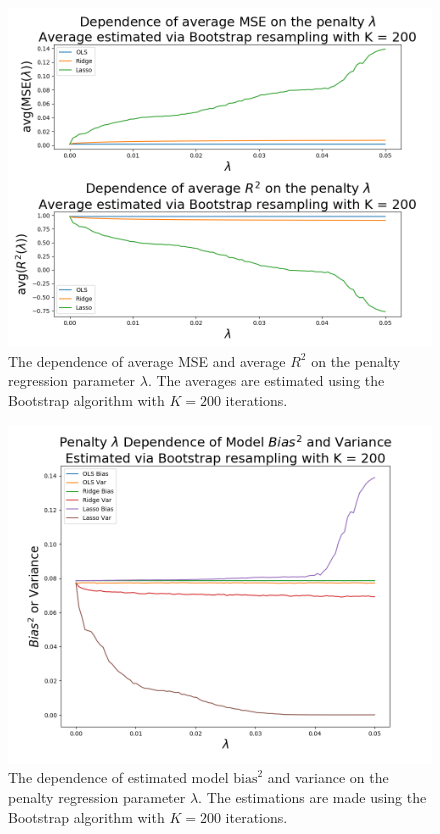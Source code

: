 \documentclass[reprint,english]{revtex4-1}
\begin{document}
\begin{figure}[h]
\centering
\includegraphics[scale=0.3,clip,trim={0cm 0cm 0cm 0cm}]{results/FrankeApprox/error2_deg5.png}
\caption{The dependence of average MSE and average \(R^2\) on the penalty regression parameter \(\lambda\). The averages are estimated using the Bootstrap algorithm with \(K=200\) iterations.}\label{fig:error_penalty_dependence_resampled}
\end{figure}

\begin{figure}[h]
\centering
\includegraphics[scale=0.3,clip,trim={0cm 0cm 0cm 0cm}]{results/FrankeApprox/error3_deg5.png}
\caption{The dependence of estimated model \(\text{bias}^2\) and variance on the penalty regression parameter \(\lambda\). The estimations are made using the Bootstrap algorithm with \(K=200\) iterations.}\label{fig:bias_var_penalty_dependence_resampled}
\end{figure}
\end{document}
